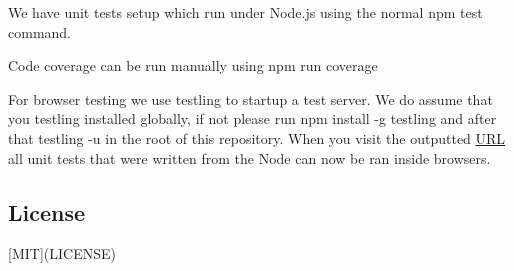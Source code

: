 \begin{DoxyEnumerate}
\item We have unit tests setup which run under Node.\+js using the normal {\ttfamily npm test} command.
\item Code coverage can be run manually using {\ttfamily npm run coverage}
\item For browser testing we use {\ttfamily testling} to startup a test server. We do assume that you {\ttfamily testling} installed globally, if not please run {\ttfamily npm install -\/g testling} and after that {\ttfamily testling -\/u} in the root of this repository. When you visit the outputted \mbox{\hyperlink{namespace_u_r_l}{U\+RL}} all unit tests that were written from the Node can now be ran inside browsers.
\end{DoxyEnumerate}

\subsection*{License}

\mbox{[}M\+IT\mbox{]}(L\+I\+C\+E\+N\+SE) 